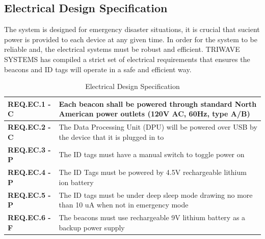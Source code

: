 \subsection{Electrical Design Specification}
\medskip
The system is designed for emergency disaster situations, it is crucial that sucient power is provided to each device at any given time. In order for the system to be reliable and, the electrical systems must be robust and efficient. TRIWAVE SYSTEMS has compiled a strict set of electrical requirements that ensures the beacons and ID tags will operate in a safe and efficient way.
\medskip
\bgroup
\def\arraystretch{1.5}
\begin{table}[H]
\centering
\begin{tabular}{ | m{3cm} | m{12.5cm} |}
\hline
\textbf{REQ.EC.1 - C} &  Each beacon shall be powered through standard North American power outlets (120V AC, 60Hz, type A/B)\\
\hline
\textbf{REQ.EC.2 - C} &  The Data Processing Unit (DPU) will be powered over USB by the device that it is plugged in to\\
\hline
\textbf{REQ.EC.3 - P} &  The ID tags must have a manual switch to toggle power on \\
\hline
\textbf{REQ.EC.4 - P} &  The ID Tags must be powered by 4.5V rechargeable lithium ion battery\\
\hline
\textbf{REQ.EC.5 - P} &  The ID tags must be under deep sleep mode drawing no more than 10 uA when not in emergency mode\\
\hline
\textbf{REQ.EC.6 - F} &  The beacons must use rechargeable 9V lithium battery as a backup power supply\\
\hline
\end{tabular}
\caption{Electrical Design Specification}
\end{table}
